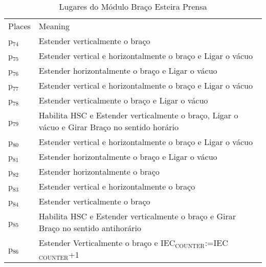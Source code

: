\begin{table}[htbp]
\caption{Lugares do Módulo Braço Esteira Prensa}
\centering
\begin{tabular}{ll}
Places & Meaning\\
p\(_{\text{74}}\) & Estender verticalmente o braço\\
p\(_{\text{75}}\) & Estender vertical e horizontalmente o braço e Ligar o vácuo\\
p\(_{\text{76}}\) & Estender horizontalmente o braço e Ligar o vácuo\\
p\(_{\text{77}}\) & Estender vertical e horizontalmente o braço e Ligar o vácuo\\
p\(_{\text{78}}\) & Estender verticalmente o braço e Ligar o vácuo\\
p\(_{\text{79}}\) & Habilita HSC e Estender verticalmente o braço, Ligar o vácuo e Girar Braço no sentido horário\\
p\(_{\text{80}}\) & Estender vertical e horizontalmente o braço e Ligar o vácuo\\
p\(_{\text{81}}\) & Estender horizontalmente o braço e Ligar o vácuo\\
p\(_{\text{82}}\) & Estender horizontalmente o braço\\
p\(_{\text{83}}\) & Estender vertical e horizontalmente o braço\\
p\(_{\text{84}}\) & Estender verticalmente o braço\\
p\(_{\text{85}}\) & Habilita HSC e Estender verticalmente o braço e Girar Braço no sentido antihorário\\
p\(_{\text{86}}\) & Estender Verticalmente o braço e IEC\(_{\text{COUNTER}}\):=IEC\(_{\text{COUNTER}}\)+1\\
\end{tabular}
\end{table}

